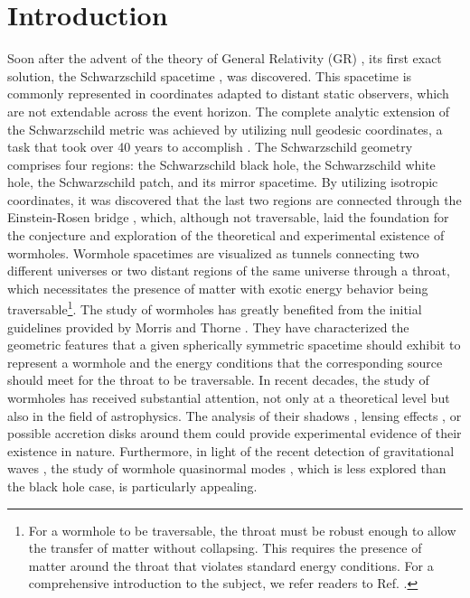 \documentclass[aps,preprint,groupedaddress,nofootinbib,superscriptaddress,showkeys,showpacs,eqsecnum,amsmath,amssymb]{revtex4-1}
\begin{document}
\maketitle


\section{Introduction}
Soon after the advent of the theory of General Relativity (GR) \cite{Einstein:1915ca,Einstein:1915by}, its first exact solution, the Schwarzschild spacetime \cite{Schwarzschild:1916uq}, was discovered. This spacetime is commonly represented in coordinates adapted to distant static observers, which are not extendable across the event horizon. The complete analytic extension of the Schwarzschild metric was achieved by utilizing null geodesic coordinates, a task that took over 40 years to accomplish \cite{Kruskal:1959vx}. The Schwarzschild geometry comprises four regions: the Schwarzschild black hole, the Schwarzschild white hole, the Schwarzschild patch, and its mirror spacetime. By utilizing isotropic coordinates, it was discovered that the last two regions are connected through the Einstein-Rosen bridge \cite{Einstein:1935tc}, which, although not traversable, laid the foundation for the conjecture and exploration of the theoretical and experimental existence of wormholes. Wormhole spacetimes are visualized as tunnels connecting two different universes or two distant regions of the same universe through a throat, which necessitates the presence of matter with exotic energy behavior being traversable\footnote{For a wormhole to be traversable, the throat must be robust enough to allow the transfer of matter without collapsing. This requires the presence of matter around the throat that violates standard energy conditions. For a comprehensive introduction to the subject, we refer readers to Ref. \cite{Visser:1995cc}.}. The study of wormholes has greatly benefited from the initial guidelines provided by Morris and Thorne \cite{Morris:1988cz}. They have characterized the geometric features that a given spherically symmetric spacetime should exhibit to represent a wormhole and the energy conditions that the corresponding source should meet for the throat to be traversable. In recent decades, the study of wormholes has received substantial attention, not only at a theoretical level but also in the field of astrophysics. The analysis of their shadows \cite{Nedkova:2013msa,Ohgami:2015nra,Shaikh:2018kfv}, lensing effects \cite{Harko:2008vy,Lamy:2018zvj}, or possible accretion disks around them \cite{Harko:2009xf,Zhou:2016koy} could provide experimental evidence of their existence in nature. Furthermore, in light of the recent detection of gravitational waves \cite{LIGOScientific:2016aoc,LIGOScientific:2017vwq}, the study of wormhole quasinormal modes \cite{Konoplya:2018ala,Blazquez-Salcedo:2018ipc}, which is less explored than the black hole case, is particularly appealing.\\
\end{document}
